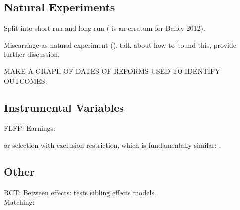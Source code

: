 \subsection{Natural Experiments}
Split into short run and long run
\citet{Bailey2011,Baileyetal2012,Bailey2006,Bailey2013,Bailey2012,Christensen2012,
GoldinKatz2002a,Guldi2008,KearnerLevine2009,Levineetal1999,AngristEvans1996,
Jacobsenetal1999,AngristEvans1998}
(\citet{Bailey2009} is an erratum for Bailey 2012).

Miscarriage as natural experiment (\citet{Hotzetal2005,Fletcher2012}).  
\citet{Hotzetal1997} talk about how to bound this, \citet{FletcherWolfe2009} 
provide further discussion.

MAKE A GRAPH OF DATES OF REFORMS USED TO IDENTIFY OUTCOMES.

\subsection{Instrumental Variables}
FLFP: \citet{Cristia2008,AgueroMarks2008,AgueroMarks2011,ChunOh2002}
Earnings:

\citet{Ananatetal2009,Miller2011,
BronarsGrogger1994,KimAassve2006,RosenzweigSchultz1987,
Caceres2006}
or selection with exclusion restriction, which is fundamentally similar: 
\citet{Ribar1994}.

\subsection{Other}
RCT: \citet{DiCensoetal2002}
Between effects: \citet{Holmlund2005,GeronimusKorenman1992} \citet{Ribar1999} 
tests sibling effects models.\\
Matching: \citet{ChevalierViitanen2003,LevinePainter2003}

\newpage


